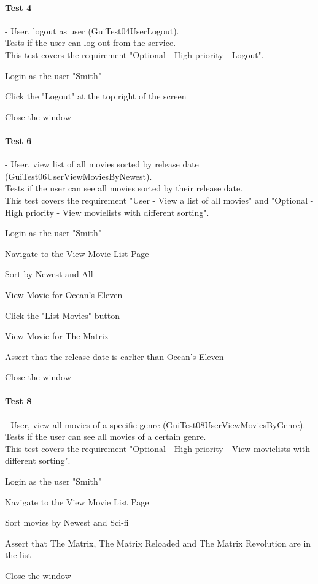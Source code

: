 \paragraph{Test 4} - User, logout as user (GuiTest04UserLogout). \\
Tests if the user can log out from the service. \\
This test covers the requirement "Optional - High priority -  Logout".
\begin{my_enumerate}
\item Login as the user "Smith"
\item Click the "Logout" at the top right of the screen
\item Close the window
\end{my_enumerate}

\paragraph{Test 6} - User, view list of all movies sorted by release date (GuiTest06UserViewMoviesByNewest). \\
Tests if the user can see all movies sorted by their release date. \\
This test covers the requirement "User - View a list of all movies" and "Optional - High priority - View movielists with different sorting".
\begin{my_enumerate}
\item Login as the user "Smith"
\item Navigate to the View Movie List Page
\item Sort by Newest and All
\item View Movie for Ocean's Eleven
\item Click the "List Movies" button
\item View Movie for The Matrix
\item Assert that the release date is earlier than Ocean's Eleven
\item Close the window
\end{my_enumerate}

\paragraph{Test 8} - User, view all movies of a specific genre (GuiTest08UserViewMoviesByGenre). \\
Tests if the user can see all movies of a certain genre. \\
This test covers the requirement "Optional - High priority - View movielists with different sorting".
\begin{my_enumerate}
\item Login as the user "Smith"
\item Navigate to the View Movie List Page
\item Sort movies by Newest and Sci-fi
\item Assert that The Matrix, The Matrix Reloaded and The Matrix Revolution are in the list
\item Close the window
\end{my_enumerate}

